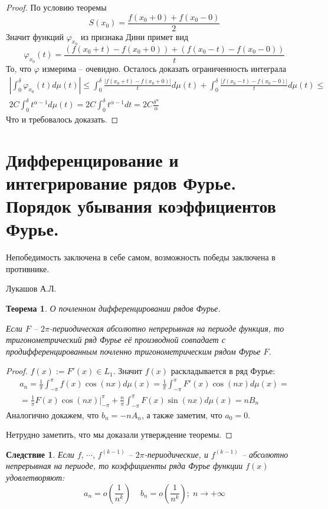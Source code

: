 \documentclass[a4paper,12pt]{article}
\renewcommand{\phi}{\ensuremath{\varphi}}
\renewcommand{\leq}{\ensuremath{\leqslant}}
\theoremstyle{plain}
\newtheorem{theorem}{Теорема}[section]
\newtheorem*{corollary}{Следствие}
\theoremstyle{definition}
\theoremstyle{remark}
\begin{document}
\begin{proof}
	По условию теоремы
	\[S(x_0) = \frac{f(x_0 + 0) + f(x_0 - 0)}{2}\]
	Значит функций $\phi_{x_0}$ из признака Дини примет вид
	\[\phi_{x_0}(t) = \frac{(f(x_0 + t) - f(x_0 + 0)) + (f(x_0 - t) - f(x_0 - 0))}{t}\]
	То, что $\phi$ измерима -- очевидно. Осталось доказать ограниченность интеграла
	\begin{align*}
		\left|\int_0^\delta \phi_{x_0}(t)d\mu(t)\right| \leq \int_0^\delta \frac{|f(x_0 + t) - f(x_0 + 0)|}{t}d\mu(t) + \int_0^\delta \frac{|f(x_0 - t) - f(x_0 - 0)|}{t}d\mu(t) \leq \\
		2C\int_0^\delta t^{\alpha - 1}d\mu(t) = 2C \int_0^\delta t^{\alpha - 1}dt = 2C\frac{\delta^\alpha}{\alpha}
	\end{align*}
	Что и требовалось доказать.
\end{proof}

\section{Дифференцирование и интегрирование рядов Фурье. Порядок убывания коэффициентов Фурье.}

\epigraph{Непобедимость заключена в себе самом, возможность победы заключена в противнике.}{Лукашов А.Л.}

\begin{theorem}
	\label{DIFF_FUR}
	О почленном дифференцировании рядов Фурье.

	Если $F$ -- $2\pi$-периодическая абсолютно непрерывная на периоде функция, то тригонометрический ряд Фурье её производной совпадает с продифференцированным почленно тригонометрическим рядом Фурье $F$.
\end{theorem}

\begin{proof}
	$f(x) := F'(x) \in L_1$. Значит $f(x)$ раскладывается в ряд Фурье:
	\begin{align*}
		a_n = \frac{1}{\pi}\int_{-\pi}^\pi f(x)\cos(nx)d\mu(x) = \frac{1}{\pi}\int_{-\pi}^\pi F'(x)\cos(nx)d\mu(x) = \\
		= \frac{1}{\pi}F(x)\cos(nx)|^\pi_{-\pi} + \frac{n}{\pi} \int_{-\pi}^\pi F(x)\sin(nx)d\mu(x) = nB_n
	\end{align*}
	Аналогично докажем, что $b_n = -nA_n$, а также заметим, что $a_0 = 0$.

	Нетрудно заметить, что мы доказали утверждение теоремы.
\end{proof}

\begin{corollary}
	Если $f,\,\cdots,\,f^{(k-1)}$ -- $2\pi$-периодические, и $f^{(k-1)}$ -- абсолютно непрерывная на периоде, то коэффициенты ряда Фурье функции $f(x)$ удовлетворяют:
	\[a_n = o\left(\frac{1}{n^k}\right)\;\;\;\; b_n = o\left(\frac{1}{n^k}\right);\; n \to +\infty\]
\end{corollary}
\end{document}
